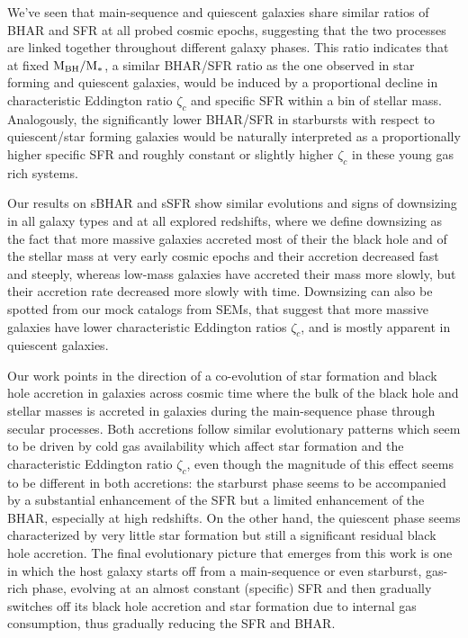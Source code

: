 We've seen that main-sequence and quiescent galaxies share similar ratios of BHAR and SFR at all probed cosmic epochs, suggesting that the two processes are linked together throughout different galaxy phases.  
This ratio indicates that at fixed ${\rm M}_{\rm BH}/{\rm M}_*$, a similar BHAR/SFR ratio as the one observed in star forming and quiescent galaxies, would be induced by a proportional decline in characteristic Eddington ratio $\zeta_c$ and specific SFR within a bin of stellar mass. Analogously, the significantly lower BHAR/SFR in starbursts with respect to quiescent/star forming galaxies would be naturally interpreted as a proportionally higher specific SFR and roughly constant or slightly higher $\zeta_c$ in these young gas rich systems.

Our results on sBHAR and sSFR show similar evolutions and signs of downsizing in all galaxy types and at all explored redshifts, where we define downsizing as the fact that more massive galaxies accreted most of their the black hole and of the stellar mass at very early cosmic epochs and their accretion decreased fast and steeply, whereas low-mass galaxies have accreted their mass more slowly, but their accretion rate decreased more slowly with time. Downsizing can also be spotted from our mock catalogs from SEMs, that suggest that more massive galaxies have lower characteristic Eddington ratios $\zeta_c$, and is mostly apparent in quiescent galaxies.

Our work points in the direction of a co-evolution of star formation and black hole accretion in galaxies across cosmic time where the bulk of the black hole and stellar masses is accreted in galaxies during the main-sequence phase through secular processes.
Both accretions follow similar evolutionary patterns which seem to be driven by cold gas availability which affect star formation and the characteristic Eddington ratio $\zeta_c$, even though the magnitude of this effect seems to be different in both accretions: the starburst phase seems to be accompanied by a substantial enhancement of the SFR but a limited enhancement of the BHAR, especially at high redshifts. On the other hand, the quiescent phase seems characterized by very little star formation but still a significant residual black hole accretion. The final evolutionary picture that emerges from this work is one in which the host galaxy starts off from a main-sequence or even starburst, gas-rich phase, evolving at an almost constant (specific) SFR and then gradually switches off its black hole accretion and star formation due to internal gas consumption, thus gradually reducing the SFR and BHAR.

